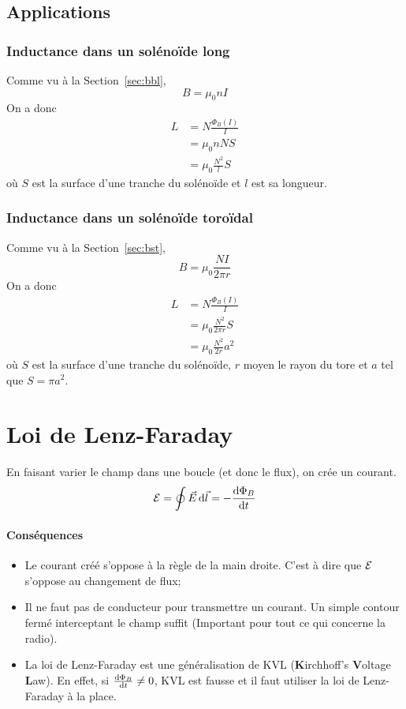 \subsection{Applications}
\subsubsection{Inductance dans un solénoïde long}
Comme vu à la Section~\ref{sec:bbl},
\[ B = \mu_0nI \]
On a donc
\begin{align*}
	L &= N\frac{\Phi_B(I)}{I}\\
	&= \mu_0 nNS\\
	&= \mu_0 \frac{N^2}{l}S
\end{align*}
où $S$ est la surface d'une tranche du solénoïde et $l$ est sa longueur.

\subsubsection{Inductance dans un solénoïde toroïdal}
Comme vu à la Section~\ref{sec:bst},
\[ B = \mu_0\frac{NI}{2\pi r} \]
On a donc
\begin{align*}
	L &= N\frac{\Phi_B(I)}{I}\\
	&= \mu_0 \frac{N^2}{2\pi r}S\\
	&= \mu_0 \frac{N^2}{2r}a^2
\end{align*}
où $S$ est la surface d'une tranche du solénoïde, $r$ moyen le rayon du tore et $a$ tel que $S = \pi a^2$.

\section{Loi de Lenz-Faraday}
\label{sec:faraday}
En faisant varier le champ dans une boucle (et donc le flux), on crée un courant.
\[ \mathcal{E} = \oint \vec E \operatorname{d}\! \vec l = -\frac{\operatorname{d}\! \Phi_B}{\operatorname{d}\! t} \]
\paragraph{Conséquences}
\begin{itemize}
	\item Le courant créé s'oppose à la règle de la main droite.
		C'est à dire que $\mathcal{E}$ s'oppose au changement de flux;
	\item Il ne faut pas de conducteur pour transmettre un courant.
		Un simple contour fermé interceptant le champ suffit
		(Important pour tout ce qui concerne la radio).
	\item La loi de Lenz-Faraday est une généralisation de KVL (\textbf{K}irchhoff's \textbf{V}oltage \textbf{L}aw).
		En effet, si $\frac{\operatorname{d}\! \Phi_B}{\operatorname{d}\! t} \neq 0$, KVL est fausse et il faut utiliser la loi de Lenz-Faraday à la place.
\end{itemize}

